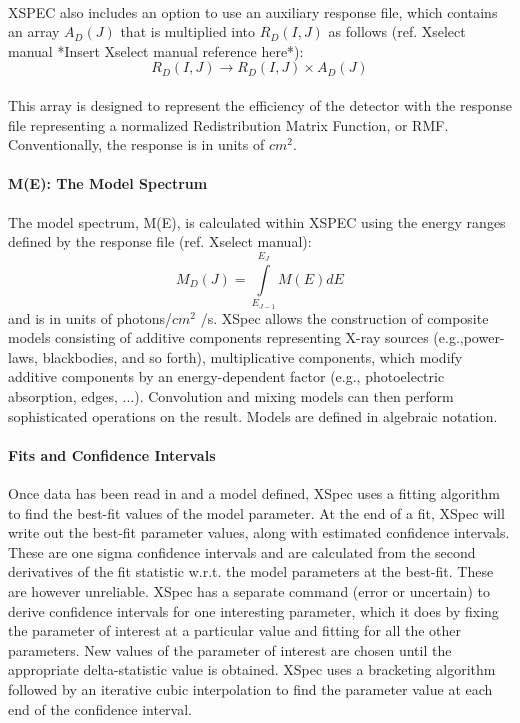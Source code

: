 \documentclass[a4paper,twoside]{report}
\numberwithin{equation}{section}
\begin{document}
\paragraph{}
XSPEC also includes an option to use an auxiliary response file, which contains an array $A_D (J)$ that is multiplied into $R_D (I, J)$ as follows (ref. Xselect manual *Insert Xselect manual reference here*):
\begin{equation}
{R_D (I,J) \rightarrow R_D (I,J) \times A_D (J)}
\end{equation}
\paragraph{}
This array is designed to represent the efficiency of the detector with the response file representing a normalized Redistribution Matrix Function, or RMF.
Conventionally, the response is in units of $cm^2$.
\paragraph{M(E): The Model Spectrum}
The model spectrum, M(E), is calculated within XSPEC using the energy
ranges defined by the response file (ref. Xselect manual):
\begin{equation}
{M_D (J) = \int\limits_{E_{J-1}}^{E_J} M(E) dE}
\end{equation}
and is in units of photons/$cm^2$ /s. XSpec allows the construction of composite models consisting of additive components representing X-ray sources (e.g.,power-laws, blackbodies, and so forth), multiplicative components, which modify additive components by an energy-dependent factor (e.g., photoelectric absorption, edges, ...). Convolution and mixing models can then perform sophisticated operations on the result. Models are defined in algebraic notation.
\paragraph{Fits and Confidence Intervals}
Once data has been read in and a model defined, XSpec uses a fitting algorithm to find the best-fit values of the model parameter. At the end of a fit, XSpec will write out the best-fit parameter values, along with estimated confidence intervals. These are one sigma confidence intervals and are calculated from the second derivatives of the fit statistic w.r.t. the model parameters at the best-fit. These are however unreliable. XSpec has a separate command (error or uncertain) to derive confidence intervals for one interesting parameter, which it does by fixing the parameter of interest at a particular value and fitting for all the other parameters. New values of the parameter of interest are chosen until the appropriate delta-statistic value is obtained. XSpec uses a bracketing algorithm followed by an iterative cubic interpolation to find the parameter value at each end of the confidence interval.
\end{document}
